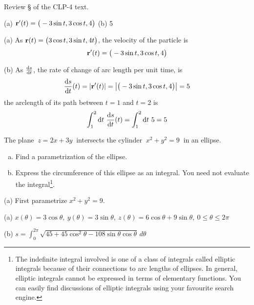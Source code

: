 \begin{hint} 
Review \S{} of the CLP-4 text.
\end{hint}

\begin{answer} 
(a) $\mathbf{r}'(t) = \big(-3 \sin t, 3 \cos t, 4\big)$\qquad
(b) 5
\end{answer}

\begin{solution} (a) As $\mathbf{r}(t) = \big(3 \cos t, 3 \sin t, 4t\big)$,
the velocity of the particle is
\begin{equation*}
\mathbf{r}'(t) = \big(-3 \sin t, 3 \cos t, 4\big)
\end{equation*}

\noindent (b) As $\diff{s}{t}$, the rate of change of arc length per unit time,
is
\begin{equation*}
\diff{s}{t}(t) = |\vr'(t)| = \big|\big(-3 \sin t, 3 \cos t, 4\big)\big|
  =5
\end{equation*}
the arclength of its path between $t = 1$ and $t = 2$ is
\begin{equation*}
\int_1^2\dee{t}\ \diff{s}{t}(t) 
=\int_1^2\dee{t}\ 5
=5
\end{equation*}
\end{solution}

\begin{question}
The plane $\ z=2x+3y\ $ intersects the cylinder 
$\ x^2+y^2=9\ $ in an ellipse. 
\begin{enumerate}[(a)]
\item
Find a parametrization of the ellipse. 
\item
Express the circumference of this ellipse as an integral. 
You need not evaluate the integral\footnote{The indefinite integral involved is one of a class of integrals called elliptic integrals because of their connections to arc lengths of ellipses. In general, elliptic integrals cannot be expressed in terms of elementary functions. You can easily find discussions of elliptic integrals using your favourite search engine.}.
\end{enumerate}
\end{question}

\begin{hint} 
(a) First parametrize $x^2+y^2=9$.
\end{hint}

\begin{answer} 
(a) $x(\theta)=3\cos\theta,\ 
y(\theta)=3\sin\theta,\ 
z(\theta)=6\cos\theta+9\sin\theta,\ 
0\le\theta\le 2\pi$

(b) $s=\int_0^{2\pi} \sqrt{45+45\cos^2\theta-108\sin\theta\cos\theta}\,d\theta$

\end{answer}

